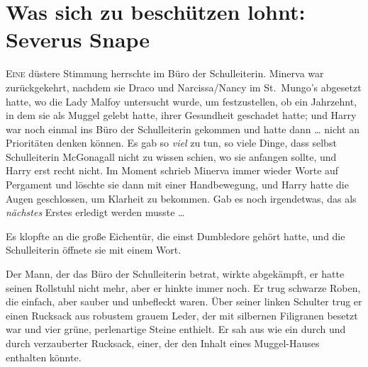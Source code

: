 \chapter{Was sich zu beschützen lohnt: Severus Snape}

\lettrine{E}{ine} düstere Stimmung herrschte im Büro der Schulleiterin. Minerva war zurückgekehrt, nachdem sie Draco und Narcissa/Nancy im St.~Mungo’s abgesetzt hatte, wo die Lady Malfoy untersucht wurde, um festzustellen, ob ein Jahrzehnt, in dem sie als Muggel gelebt hatte, ihrer Gesundheit geschadet hatte; und Harry war noch einmal ins Büro der Schulleiterin gekommen und hatte dann … nicht an Prioritäten denken können. Es gab so \emph{viel} zu tun, so viele Dinge, dass selbst Schulleiterin McGonagall nicht zu wissen schien, wo sie anfangen sollte, und Harry erst recht nicht. Im Moment schrieb Minerva immer wieder Worte auf Pergament und löschte sie dann mit einer Handbewegung, und Harry hatte die Augen geschlossen, um Klarheit zu bekommen.
Gab es noch irgendetwas, das als \emph{nächstes} Erstes erledigt werden musste …

Es klopfte an die große Eichentür, die einst Dumbledore gehört hatte, und die Schulleiterin öffnete sie mit einem Wort.

Der Mann, der das Büro der Schulleiterin betrat, wirkte abgekämpft, er hatte seinen Rollstuhl nicht mehr, aber er hinkte immer noch. Er trug schwarze Roben, die einfach, aber sauber und unbefleckt waren. Über seiner linken Schulter trug er einen Rucksack aus robustem grauem Leder, der mit silbernen Filigranen besetzt war und vier grüne, perlenartige Steine enthielt. Er sah aus wie ein durch und durch verzauberter Rucksack, einer, der den Inhalt eines Muggel-Hauses enthalten könnte.

